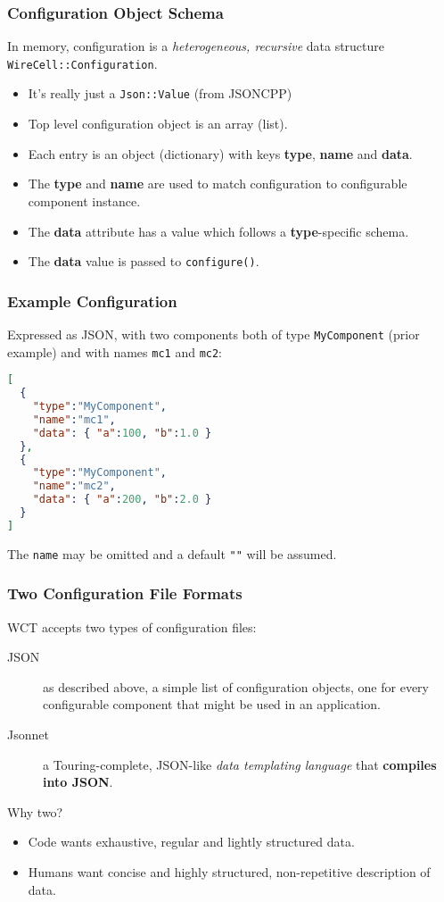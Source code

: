 \documentclass[xcolor=dvipsnames]{beamer}
\begin{document}
\begin{frame}
  \frametitle{Configuration Object Schema}
  In memory, configuration is a \textit{heterogeneous, recursive}
  data structure \texttt{WireCell::Configuration}.
  \begin{itemize}
  \item It's really just a \texttt{Json::Value} (from JSONCPP)
  \item Top level configuration object is an array (list).
  \item Each entry is an object (dictionary) with keys \textbf{type},
    \textbf{name} and \textbf{data}.
  \item The \textbf{type} and \textbf{name} are used to match
    configuration to configurable component instance.
  \item The \textbf{data} attribute has a value which follows a
    \textbf{type}-specific schema.
  \item The \textbf{data} value is passed to \texttt{configure()}.
  \end{itemize}
\end{frame}

\begin{frame}[fragile]
  \frametitle{Example Configuration}

  Expressed as JSON, with two components both of type
  \texttt{MyComponent} (prior example) and with names \texttt{mc1} and
  \texttt{mc2}:

\begin{lstlisting}[language=json]
[ 
  {
    "type":"MyComponent",
    "name":"mc1",
    "data": { "a":100, "b":1.0 }
  },
  { 
    "type":"MyComponent",
    "name":"mc2",
    "data": { "a":200, "b":2.0 }
  }
]
\end{lstlisting}

  The \texttt{name} may be omitted and a default \texttt{""} will be assumed.

\end{frame}


\begin{frame}
  \frametitle{Two Configuration File Formats}
  WCT accepts two types of configuration files:

  \begin{description}
  \item[JSON] as described above, a simple list of configuration
    objects, one for every configurable component that might be used
    in an application.
  \item[Jsonnet] a Touring-complete, JSON-like \textit{data templating
    language} that \textbf{compiles into JSON}.
  \end{description}
  Why two?
  \begin{itemize}
  \item Code wants exhaustive, regular and lightly structured data.
  \item Humans want concise and highly structured, non-repetitive
    description of data.
  \end{itemize}
\end{frame}
\end{document}
